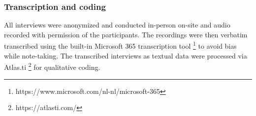 \subsubsection{Transcription and coding}
All interviews were anonymized and conducted in-person on-site and audio recorded with permission of the participants. The recordings were then verbatim transcribed using the built-in Microsoft 365 transcription tool \footnote{https://www.microsoft.com/nl-nl/microsoft-365} to avoid bias while note-taking. The transcribed interviews as textual data were processed via Atlas.ti \footnote{https://atlasti.com/} for qualitative coding.